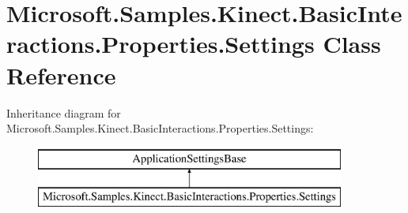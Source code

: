 \hypertarget{class_microsoft_1_1_samples_1_1_kinect_1_1_basic_interactions_1_1_properties_1_1_settings}{\section{Microsoft.\-Samples.\-Kinect.\-Basic\-Interactions.\-Properties.\-Settings Class Reference}
\label{class_microsoft_1_1_samples_1_1_kinect_1_1_basic_interactions_1_1_properties_1_1_settings}
}
Inheritance diagram for Microsoft.\-Samples.\-Kinect.\-Basic\-Interactions.\-Properties.\-Settings\-:\begin{figure}[H]
\begin{center}
\leavevmode
\includegraphics[height=2.000000cm]{class_microsoft_1_1_samples_1_1_kinect_1_1_basic_interactions_1_1_properties_1_1_settings}
\end{center}
\end{figure}
